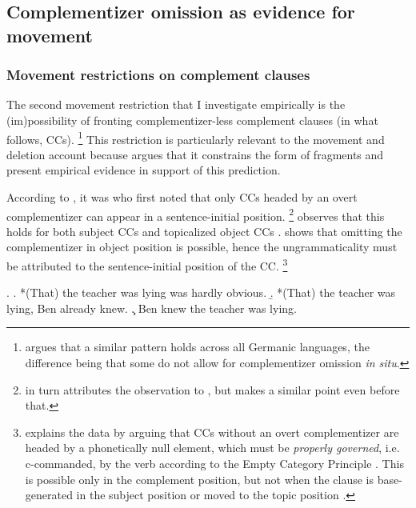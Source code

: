 \subsection{Complementizer omission as evidence for movement}\label{sec:ccs-background}
\subsubsection{Movement restrictions on complement clauses}
The second movement restriction that I investigate empirically is the (im)possibi\-lity of fronting complementizer-less complement clauses (in what follows, CCs).%
%
\footnote{\citet[83--85]{webelhuth1992} argues that a similar pattern holds across all Germanic languages, the difference being that some do not allow for complementizer omission \textit{in situ}.} %
%
This restriction is particularly relevant to the movement and deletion account because \citet{merchant2004} argues that it constrains the form of fragments and \citet{merchant.etal2013} present empirical evidence in support of this prediction.

According to \citet{merchant2004}, it was \citet{stowell1981} who first noted that only CCs headed by an overt complementizer can appear in a sentence-initial position.%
%
\footnote{\citet{stowell1981} in turn attributes the observation to \citet{kayne1981}, but \citet[744]{morgan1973} makes a similar point even before that.}\afterfn%
%
\citet[396f]{stowell1981} observes that this holds for both subject CCs \Next[a] and topicalized object CCs \Next[b]. \Next[c] shows that omitting the complementizer in object position is possible, hence the ungrammaticality must be attributed to the sentence-initial position of the CC.%
%
\footnote{
\citet[396]{stowell1981} explains the data by arguing that CCs without an overt complementizer are headed by a phonetically null element, which must be  \textit{properly governed}, i.e. c-commanded, by the verb according to the Empty Category Principle \citep{chomsky1981}. This is possible only in the complement position, but not when the clause is base-generated in the subject position \Last[a] or moved to the topic position \Last[b].}\afterfn%
%
\largerpage

\ex. \a. *(That) the teacher was lying was hardly obvious.
      \b. *(That) the teacher was lying, Ben already knew.
 \c. Ben knew the teacher was lying.


